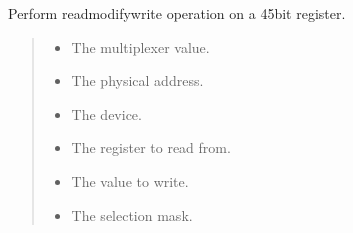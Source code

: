 \documentclass[letterpaper,10pt,english]{sphinxmanual}
\begin{document}

\begin{fulllineitems}
\label{\detokenize{cplddocs:phy_marvell_88X2222_init.readmodifywrite}}
\pysigstartsignatures
{}
\pysigstopsignatures
\sphinxAtStartPar
Perform read\sphinxhyphen{}modify\sphinxhyphen{}write operation on a 45\sphinxhyphen{}bit register.
\begin{quote}\begin{description}
\begin{itemize}
\item {} 
\sphinxAtStartPar
{} \textendash{} The multiplexer value.

\item {} 
\sphinxAtStartPar
{} \textendash{} The physical address.

\item {} 
\sphinxAtStartPar
{} \textendash{} The device.

\item {} 
\sphinxAtStartPar
{} \textendash{} The register to read from.

\item {} 
\sphinxAtStartPar
{} \textendash{} The value to write.

\item {} 
\sphinxAtStartPar
{} \textendash{} The selection mask.

\end{itemize}

\end{description}\end{quote}

\end{fulllineitems}
\end{document}
